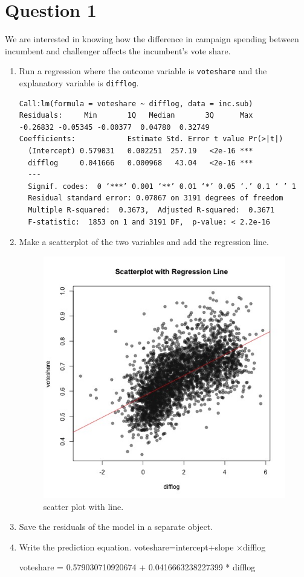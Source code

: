 \documentclass[12pt,letterpaper]{article}
\begin{document}
\section*{Question 1}
\vspace{.25cm}
\noindent We are interested in knowing how the difference in campaign spending between incumbent and challenger affects the incumbent's vote share. 
	\begin{enumerate}
		\item Run a regression where the outcome variable is \texttt{voteshare} and the explanatory variable is \texttt{difflog}.	
	  
\begin{verbatim}
Call:lm(formula = voteshare ~ difflog, data = inc.sub)
Residuals:     Min       1Q   Median       3Q      Max 
-0.26832 -0.05345 -0.00377  0.04780  0.32749 
Coefficients:            Estimate Std. Error t value Pr(>|t|)  
  (Intercept) 0.579031   0.002251  257.19   <2e-16 ***
  difflog     0.041666   0.000968   43.04   <2e-16 ***
  ---
  Signif. codes:  0 ‘***’ 0.001 ‘**’ 0.01 ‘*’ 0.05 ‘.’ 0.1 ‘ ’ 1
  Residual standard error: 0.07867 on 3191 degrees of freedom
  Multiple R-squared:  0.3673,	Adjusted R-squared:  0.3671 
  F-statistic:  1853 on 1 and 3191 DF,  p-value: < 2.2e-16
\end{verbatim} 	
		\item Make a scatterplot of the two variables and add the regression line. 	
 
	\begin{figure}[h!]\centering
		\caption{\footnotesize scatter plot with line.}
		\label{fig:plot_1}
		\includegraphics[width=.45\textwidth]{voteshare_difflog.jpeg}
	\end{figure}

		\item Save the residuals of the model in a separate object.	
	 	
		\item Write the prediction equation.\vspace{1cm}
voteshare=intercept+slope ×difflog
 	
voteshare = 0.579030710920674 + 0.0416663238227399 * difflog 
	\end{enumerate}
	
\end{document}
